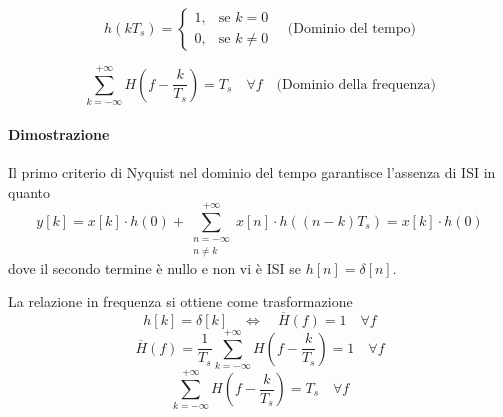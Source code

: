 \[ h(kT_s) = 
    \begin{cases} 
        1, & \text{se } k=0 \\
        0, & \text{se } k \neq 0
    \end{cases}
\quad \text{(Dominio del tempo)}
\]

\[ \sum_{k=-\infty}^{+\infty} H\left(f-\frac{k}{T_s}\right) = T_s \quad \forall f \quad \text{(Dominio della frequenza)} \]




\paragraph*{Dimostrazione}
Il primo criterio di Nyquist nel dominio del tempo garantisce l'assenza di ISI in quanto
\[ y[k] = x[k] \cdot h(0) + \sum_{\substack{n=-\infty \\ n \neq k}}^{+\infty} x[n] \cdot h((n-k)T_s) = x[k] \cdot h(0) \]
dove il secondo termine è nullo e non vi è ISI se \( h[n] = \delta[n] \).

La relazione in frequenza si ottiene come trasformazione
\[ h[k] = \delta[k] \quad \Longleftrightarrow \quad \overline{H}(f) = 1 \quad \forall f \]
\[ \overline{H}(f) = \frac{1}{T_s} \sum_{k=-\infty}^{+\infty} H\left(f - \frac{k}{T_s}\right) = 1 \quad \forall f \]
\[ \sum_{k=-\infty}^{+\infty} H\left(f - \frac{k}{T_s}\right) = T_s \quad \forall f \]


